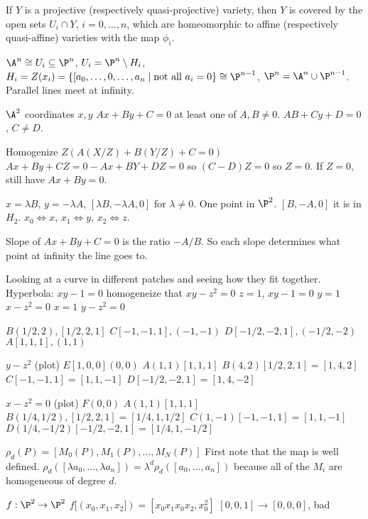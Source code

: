 \begin{cor}
If $Y$ is a projective (respectively quasi-projective) variety, then $Y$ is covered by the open sets $U_i \cap Y$, $i= 0,\ldots,n$, which are homeomorphic to affine (respectively quasi-affine) varieties with the map $\phi_i$. 
\end{cor}


$\A^n \cong U_i \subseteq \P^n$, $U_i= \P^n \setminus H_i$, $H_i= Z(x_i)= \{ [a_0,\ldots,0,\ldots,a_n \;|\; \text{not all }a_i=0 \} \cong \P^{n-1}$, $\P^n= \A^n \cup \P^{n-1}$. Parallel lines meet at infinity. 



$\A^2$ coordinates $x,y$
$Ax+By+C=0$ at least one of $A,B \neq 0$.
$AB+Cy+D=0$, $C \neq D$.

Homogenize 
$Z(A(X/Z)+B(Y/Z)+C=0)$
$Ax+By+CZ=0-Ax+BY+DZ=0$ so $(C-D)Z=0$ so $Z=0$. 
If $Z=0$, still have $Ax+By= 0$. 

$x= \lambda B$, $y= -\lambda A$, $[\lambda B, -\lambda A,0]$ for $\lambda \neq 0$. One point in $\P^2$. $[B,-A,0]$ it is in $H_2$. $x_0 \iff x$, $x_1 \iff y$, $x_2 \iff z$.

Slope of $Ax+By+C=0$ is the ratio $-A/B$. So each slope determines what point at infinity the line goes to. 



Looking at a curve in different patches and seeing how they fit together. 
Hyperbola: $xy-1=0$
homogeneize that $xy-z^2=0$
$z=1$, $xy-1=0$
$y=1$ $x-z^2=0$
$x=1$ $y-z^2=0$


$B(1/2,2), [1/2,2,1] $
$C[-1,-1,1], (-1,-1)$
$D[-1/2,-2,1], (-1/2,-2)$
$A[1,1,1],(1,1)$

$y- z^2$ (plot)
$E[1,0,0] (0,0)$
$A(1,1)[1,1,1]$
$B(4,2)[1/2,2,1]=[1,4,2]$
$C[-1,-1,1]=[1,1,-1]$
$D[-1/2,-2,1]=[1,4,-2]$

$x-z^2=0$ (plot)
$F(0,0)$
$A(1,1)[1,1,1]$
$B(1/4,1/2), [1/2,2,1]=[1/4,1,1/2]$
$C(1,-1)[-1,-1,1]= [1,1,-1]$
$D(1/4,-1/2)[-1/2,-2,1]=[1/4,1,-1/2]$



$\rho_d(P)= [M_0(P), M_1(P), \ldots, M_N(P)]$
First note that the map is well defined.
$\rho_d([\lambda a_0,\ldots, \lambda a_n])= \lambda^d \rho_d([a_0,\ldots,a_n])$ because all of the $M_i$ are homogeneous of degree $d$. 

$f: \P^2 \to \P^2$
$f[(x_0,x_1,x_2])= [x_0x_1x_0x_2,x_0^2]$
$[0,0,1] \to [0,0,0]$, bad 

